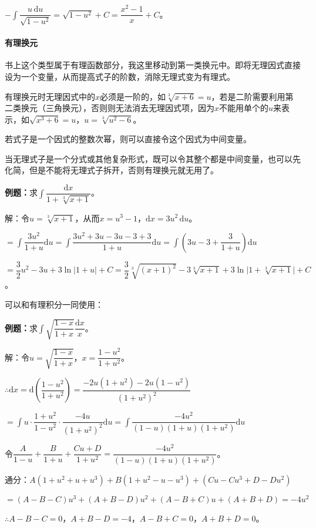 \documentclass[UTF8, 12pt]{ctexart}
\begin{document}
$-\displaystyle{\int\dfrac{u\,\textrm{d}u}{\sqrt{1-u^2}}}=\sqrt{1-u^2}+C=\dfrac{x^2-1}{x}+C$。

\paragraph{有理换元} \leavevmode \medskip

书上这个类型属于有理函数部分，我这里移动到第一类换元中。即将无理因式直接设为一个变量，从而提高式子的阶数，消除无理式变为有理式。

有理换元时无理因式中的$x$必须是一阶的，如$\sqrt[3]{x+6}=u$，若是二阶需要利用第二类换元（三角换元），否则则无法消去无理因式项，因为$x$不能用单个的$u$来表示，如$\sqrt{x^3+6}=u$，$u=\sqrt[3]{u^2-6}$。

若式子是一个因式的整数次幂，则可以直接令这个因式为中间变量。

当无理式子是一个分式或其他复杂形式，既可以令其整个都是中间变量，也可以先化简，但是不能将无理式子拆开，否则有理换元就无用了。

\textbf{例题：}求$\displaystyle{\int\dfrac{\textrm{d}x}{1+\sqrt[3]{x+1}}}$。

解：令$u=\sqrt[3]{x+1}$，从而$x=u^3-1$，$\textrm{d}x=3u^2\,\textrm{d}u$。

$=\displaystyle{\int\dfrac{3u^2}{1+u}\textrm{d}u=\int\dfrac{3u^2+3u-3u-3+3}{1+u}\textrm{d}u=\int\left(3u-3+\dfrac{3}{1+u}\right)\textrm{d}u}$

$=\dfrac{3}{2}u^2-3u+3\ln\vert1+u\vert+C=\dfrac{3}{2}\sqrt[3]{(x+1)^2}-3\sqrt[3]{x+1}+3\ln\vert1+\sqrt[3]{x+1}\vert+C$。

可以和有理积分一同使用：

\textbf{例题：}求$\displaystyle{\int\sqrt{\dfrac{1-x}{1+x}}\dfrac{\textrm{d}x}{x}}$。\medskip

解：令$u=\sqrt{\dfrac{1-x}{1+x}}$，$x=\dfrac{1-u^2}{1+u^2}$。

$\therefore\textrm{d}x=\textrm{d}\left(\dfrac{1-u^2}{1+u^2}\right)=\dfrac{-2u(1+u^2)-2u(1-u^2)}{(1+u^2)^2}$

$=\displaystyle{\int u\cdot\dfrac{1+u^2}{1-u^2}\cdot\dfrac{-4u}{(1+u^2)^2}\textrm{d}u=\int\dfrac{-4u^2}{(1-u)(1+u)(1+u^2)}\textrm{d}u}$

令$\dfrac{A}{1-u}+\dfrac{B}{1+u}+\dfrac{Cu+D}{1+u^2}=\dfrac{-4u^2}{(1-u)(1+u)(1+u^2)}$。

通分：$A(1+u^2+u+u^3)+B(1+u^2-u-u^3)+(Cu-Cu^3+D-Du^2)$

$=(A-B-C)u^3+(A+B-D)u^2+(A-B+C)u+(A+B+D)=-4u^2$

$\therefore A-B-C=0$，$A+B-D=-4$，$A-B+C=0$，$A+B+D=0$。
\end{document}
